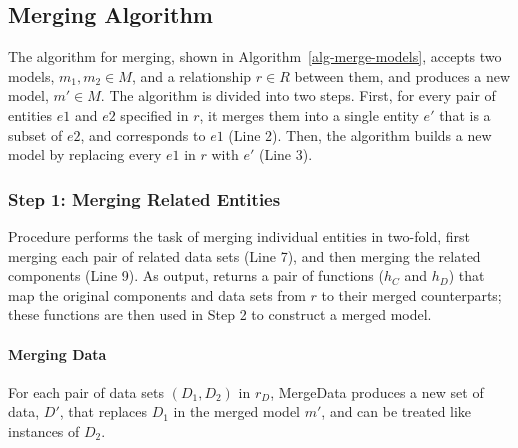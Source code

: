 

\subsection{Merging Algorithm}

The algorithm for merging, shown in Algorithm~\ref{alg-merge-models},
accepts two models, $m_{1}, m_{2} \in M$, and a relationship $r \in R$
between them, and produces a new model, $m' \in M$. The algorithm is
divided into two steps. First, for every pair of entities $e1$ and
$e2$ specified in $r$, it merges them into a single entity $e'$ that is a
subset of $e2$, and corresponds to $e1$ (Line 2). Then, the algorithm
builds a new model by replacing every $e1$ in $r$ with $e'$ (Line 3).


\subsubsection{Step 1: Merging Related Entities}

Procedure  performs the task of merging individual
entities in two-fold, first merging each pair of related data sets
(Line 7), and then merging the related components (Line
9). As output,  returns a pair of functions
($h_{C}$ and $h_{D}$) that map the original components and data sets
from $r$ to their merged counterparts; these functions are then used
in Step 2 to construct a merged model.


\paragraph{\textbf{Merging Data}} For each pair of data sets $(D_{1},
D_{2})$ in $r_{D}$, \textsf{MergeData} produces a new set of data, $D'$,
that replaces $D_{1}$ in the merged model $m'$, and can be treated
like instances of $D_{2}$. 

